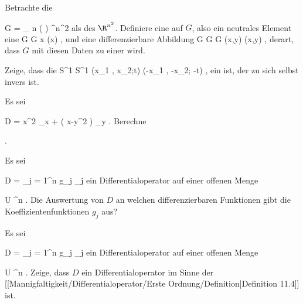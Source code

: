 {}
{

Betrachte die

\mavergleichskette
{\vergleichskette
{G
}
{ = }{ _{  n   } \! \left(  \R  \right)
}
{ \subseteq }{ \R^{n^2}
}
{    }{
}
{   }{
}
}
{}{}{}
als
des $\R^{n^2}$. Definiere eine  {} auf $G$, also ein neutrales Element
 eine
\maabbeledisp {\alpha} { G } { G
} { x } { \alpha (x)
} {,}
und eine differenzierbare Abbildung
\maabbeledisp {\varphi} {G \times G} {G
} {(x,y)} { \varphi(x,y)
} {,}
derart, dass $G$ mit diesen Daten zu einer
wird.

}
{} {}

{}
{

Zeige, dass die
\maabbeledisp {\varphi} {S^1 \times \R } { S^1 \times \R
} {(x_1 , x_2;t)} {(-x_1 , -x_2; -t)
} {,}
ein
 
ist, der zu sich selbst invers ist.

}
{} {}

{}
{

Es sei

\mavergleichskette
{\vergleichskette
{ D
}
{ = }{ x^2 \partial_x +  \left(  x-y^2  \right) \partial_y
}
{  }{
}
{    }{
}
{   }{
}
}
{}{}{.}
Berechne

 { . }

}
{} {}

{}
{

Es sei

\mavergleichskette
{\vergleichskette
{ D
}
{ = }{ \sum_{j = 1}^n g_j \partial_j
}
{  }{
}
{    }{
}
{   }{
}
}
{}{}{}
ein Differentialoperator auf einer offenen Menge

\mavergleichskette
{\vergleichskette
{ U
}
{ \subseteq }{ \R^n
}
{  }{
}
{    }{
}
{   }{
}
}
{}{}{.}
Die Auswertung von $D$ an welchen differenzierbaren Funktionen gibt die Koeffizientenfunktionen $g_j$  aus?

}
{} {}

{}
{

Es sei

\mavergleichskette
{\vergleichskette
{ D
}
{ = }{ \sum_{j = 1}^n g_j \partial_j
}
{  }{
}
{    }{
}
{   }{
}
}
{}{}{}
ein Differentialoperator auf einer offenen Menge

\mavergleichskette
{\vergleichskette
{ U
}
{ \subseteq }{ \R^n
}
{  }{
}
{    }{
}
{   }{
}
}
{}{}{.}
Zeige, dass $D$ ein Differentialoperator im Sinne der
[[Mannigfaltigkeit/Differentialoperator/Erste Ordnung/Definition|Definition 11.4]]
ist.

}
{} {}


